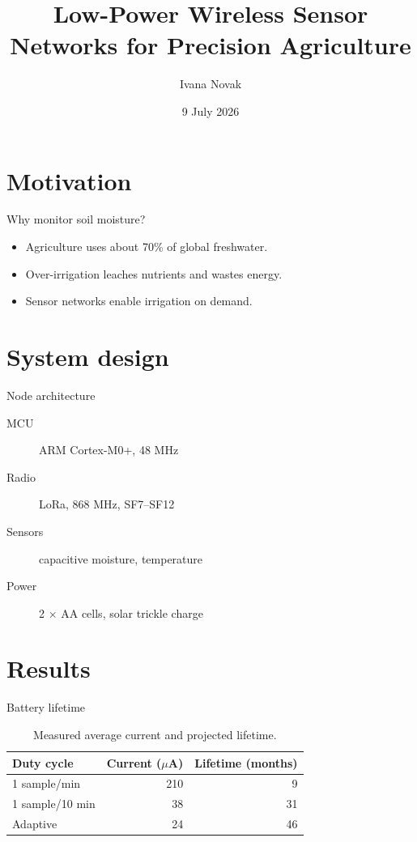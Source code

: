 \documentclass[aspectratio=169]{beamer}
\title[Thesis Defense]{Low-Power Wireless Sensor Networks for Precision Agriculture}
\author[I. Novak]{Ivana Novak}
\institute[UZ]{Faculty of Electrical Engineering\\University of Zagreb}
\date{9 July 2026}
\begin{document}
\frame{\titlepage}

\section{Motivation}
\begin{frame}{Why monitor soil moisture?}
  \begin{itemize}
    \item Agriculture uses about 70\% of global freshwater.
    \item Over-irrigation leaches nutrients and wastes energy.
    \item Sensor networks enable irrigation on demand.
  \end{itemize}
\end{frame}

\section{System design}
\begin{frame}{Node architecture}
  \begin{description}
    \item[MCU] ARM Cortex-M0+, 48 MHz
    \item[Radio] LoRa, 868 MHz, SF7--SF12
    \item[Sensors] capacitive moisture, temperature
    \item[Power] 2 $\times$ AA cells, solar trickle charge
  \end{description}
\end{frame}

\section{Results}
\begin{frame}{Battery lifetime}
  \begin{table}
    \centering
    \begin{tabular}{lrr}
      \toprule
      Duty cycle & Current ($\mu$A) & Lifetime (months) \\
      \midrule
      1 sample/min  & 210 & 9 \\
      1 sample/10 min & 38 & 31 \\
      Adaptive & 24 & 46 \\
      \bottomrule
    \end{tabular}
    \caption{Measured average current and projected lifetime.}
  \end{table}
\end{frame}
\end{document}
